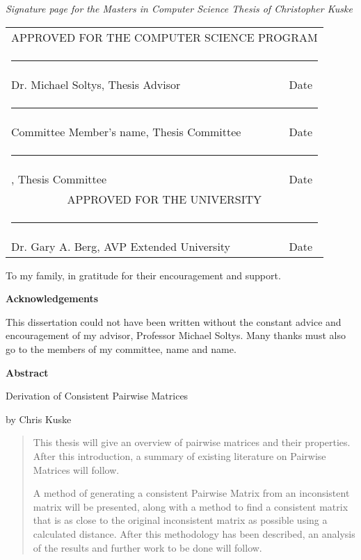 \documentclass[12pt]{amsart}
\newcommand{\chairfaculty}{Dr. Michael Soltys}
\newcommand{\firstfaculty}{Committee Member's name}
\newcommand{\univefaculty}{Dr. Gary A. Berg}
\def\thesistitle{Derivation of Consistent Pairwise Matrices}
\def\name{Chris Kuske}
\newif \ifshort
\newcommand{\committee}[1]{\ifshort {\committeeshort} \else {\committeelong} \fi}
\newcommand{\committeeshort}{\vspace*{2.13in} \begin{tabular}{ll}
   \multicolumn{2}{c}{\hspace*{2.9cm} APPROVED FOR THE COMPUTER SCIENCE PROGRAM}\\[10mm]
   \multicolumn{2}{c}{\hspace*{1.65cm}\rule{4.5in}{.01in}}\\[-4mm]
   \hspace*{3cm}\chairfaculty, Thesis Advisor \hspace*{0cm}&  Date\\[4mm]
   \multicolumn{2}{c}{\hspace*{1.65cm}\rule{4.5in}{.01in}}\\[-4mm]
   \hspace*{3cm}\firstfaculty, Thesis Committee \hspace*{0cm}&  Date\\[17mm]
   \multicolumn{2}{c}{\hspace*{6.15cm} APPROVED FOR THE UNIVERSITY}\\[6mm]
   \multicolumn{2}{c}{\hspace*{1.9cm}\rule{4.5in}{.01in}}\\[-4mm]
   \hspace*{3cm}\univefaculty, AVP Extended University \hspace*{0cm}&  Date\\
 \end{tabular}}
\newcommand{\committeelong}{\vspace*{1.25in} \begin{tabular}{ll}
   \multicolumn{2}{c}{\hspace*{2.9cm} APPROVED FOR THE COMPUTER SCIENCE PROGRAM}\\[10mm]
   \multicolumn{2}{c}{\hspace*{1.65cm}\rule{4.5in}{.01in}}\\[-4mm]
   \hspace*{3cm}\chairfaculty, Thesis Advisor \hspace*{0cm}&  Date\\[4mm]
   \multicolumn{2}{c}{\hspace*{1.65cm}\rule{4.5in}{.01in}}\\[-4mm]
   \hspace*{3cm}\firstfaculty, Thesis Committee \hspace*{0cm}&  Date\\[17mm]
   \multicolumn{2}{c}{\hspace*{1.65cm}\rule{4.5in}{.01in}}\\[-4mm]
   \hspace*{3cm}\seconfaculty, Thesis Committee  &  Date\\[20mm]
   \multicolumn{2}{c}{\hspace*{6.15cm} APPROVED FOR THE UNIVERSITY}\\[6mm]
   \multicolumn{2}{c}{\hspace*{1.9cm}\rule{4.5in}{.01in}}\\[-4mm]
   \hspace*{3cm}\univefaculty, AVP Extended University \hspace*{0cm}&  Date\\
 \end{tabular}}
\theoremstyle{definition}
\begin{document}
\newpage
 \setlength{\paperheight}{13in}
 \setlength{\topmargin}{1.25cm}

{\center\emph{Signature page for the Masters in Computer Science Thesis of Christopher Kuske }}

\committee


 \newpage
 \setlength{\topmargin}{-0.4375in}
 \setlength{\paperheight}{11.5in}

\begin{center}
\vspace*{60mm}

To my family, in gratitude for their encouragement and support.

\end{center}


\newpage

\begin{center}
\vspace*{50mm}
{\bf Acknowledgements}
\end{center}

This dissertation could not have been written without the constant advice and encouragement of my advisor, Professor Michael Soltys.
Many thanks must also go to the members of my committee, name and name. 

\newpage
\pagestyle{plain}
 

{\bf Abstract}

\bigskip

\thesistitle

by
\name \bigskip
\begin{quote}

This thesis will give an overview of pairwise matrices and their properties. After this introduction, a summary of existing literature on Pairwise Matrices will follow.  

A method of generating a consistent Pairwise Matrix from an inconsistent matrix will be presented, along with a method to find a consistent matrix that is as close to the original inconsistent matrix as possible using a calculated distance.  After this methodology has been described, an analysis of the results and further work to be done will follow.
\end{quote} 
\end{document}
